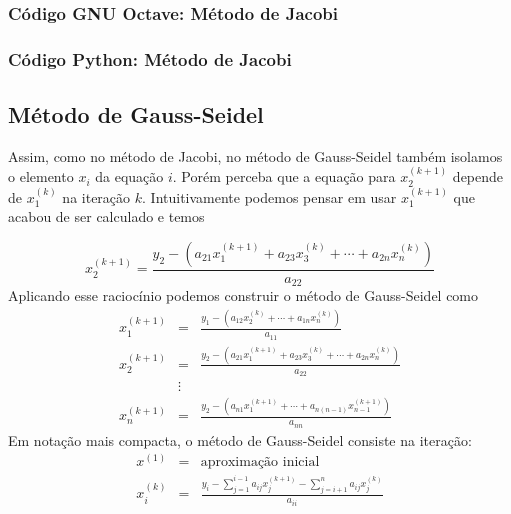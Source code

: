 
\fi
\ifisoctave
\subsubsection{Código GNU Octave: Método de Jacobi}


\fi
\ifispython
\subsubsection{Código Python: Método de Jacobi}


\fi

\subsection{Método de Gauss-Seidel}

Assim, como no método de Jacobi, no método de Gauss-Seidel também isolamos o elemento $x_i$ da equação $i$. Porém perceba que a equação para $x_2^{(k+1)}$ depende de $x_1^{(k)}$ na iteração $k$. Intuitivamente podemos pensar em usar $x_1^{(k+1)}$ que acabou de ser calculado e temos

\begin{equation*}
x_2^{(k+1)} =\frac{y_2 - \left(a_{21}x_1^{(k+1)}+a_{23}x_3^{(k)}+\cdots+a_{2n}x_n^{(k)}\right)}{a_{22}}
\end{equation*}
Aplicando esse raciocínio podemos construir o método de Gauss-Seidel como
\begin{eqnarray*}
x_1^{(k+1)}&=&\frac{y_1 - \left(a_{12}x_2^{(k)}+\cdots+a_{1n}x_n^{(k)}\right)}{a_{11}}\\
x_2^{(k+1)}&=&\frac{y_2 - \left(a_{21}x_1^{(k+1)}+a_{23}x_3^{(k)}+\cdots+a_{2n}x_n^{(k)}\right)}{a_{22}}\\
&\vdots&\\
x_n^{(k+1)}&=&\frac{y_2 - \left(a_{n1}x_1^{(k+1)}+\cdots+a_{n(n-1)}x_{n-1}^{(k+1)}\right)}{a_{nn}}
\end{eqnarray*}
Em notação mais compacta, o método de Gauss-Seidel consiste na iteração:
\begin{eqnarray*}
  x^{(1)} &=& \text{aproximação inicial}\\
  x_i^{(k)} &=& \frac{y_i - \sum_{j=1}^{i-1} a_{ij}x_j^{(k+1)} -\sum_{j=i+1}^{n} a_{ij}x_j^{(k)}}{a_{ii}}
\end{eqnarray*}

